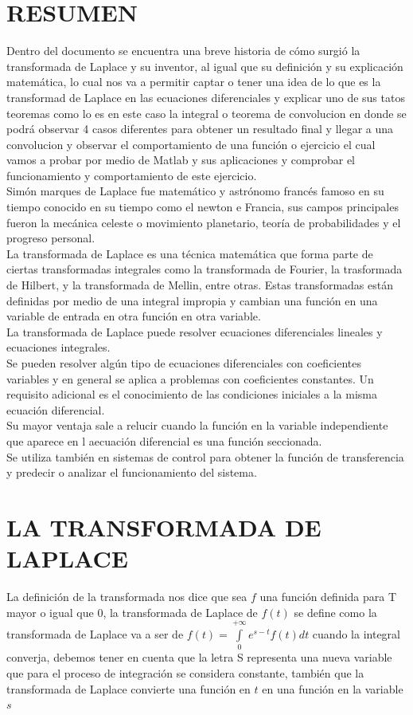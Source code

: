\documentclass[11pt,letterpaper]{article}
\begin{document}
\section{RESUMEN}
Dentro del documento se encuentra una breve historia de cómo surgió la transformada de Laplace y su inventor, al igual que su definición y su explicación matemática, lo cual nos va a permitir captar o tener una idea de lo que es la transformad de Laplace en las ecuaciones diferenciales y explicar uno de sus tatos teoremas como lo es en este caso la integral o teorema de convolucion en donde se podrá observar 4 casos diferentes para obtener un resultado final y llegar a una convolucion y observar el comportamiento de una función o ejercicio el cual vamos a probar por medio de Matlab y sus aplicaciones y comprobar el funcionamiento y comportamiento de este
ejercicio.\\
Simón marques de Laplace fue matemático y astrónomo francés famoso en su tiempo conocido en
su tiempo como el newton e Francia, sus campos principales fueron la mecánica celeste o
movimiento planetario, teoría de probabilidades y el progreso personal.\\
 La transformada de Laplace es una técnica matemática que forma parte de ciertas transformadas integrales como la transformada de Fourier, la trasformada de Hilbert, y la transformada de Mellin, entre otras. Estas transformadas están definidas por medio de una integral impropia y
cambian una función en una variable de entrada en otra función en otra variable. 
\\La transformada de Laplace puede resolver ecuaciones diferenciales lineales y ecuaciones
integrales.\\Se pueden resolver algún tipo de ecuaciones diferenciales con coeficientes variables y en general se aplica a problemas con coeficientes constantes. Un requisito adicional es el conocimiento de las
condiciones iniciales a la misma ecuación diferencial.\\Su mayor ventaja sale a relucir cuando la función en la variable independiente que aparece en l aecuación diferencial es una función seccionada.\\
Se utiliza también en sistemas de control para obtener la función de transferencia y predecir o analizar el funcionamiento del sistema.\\
\section{LA TRANSFORMADA DE LAPLACE}
La definición de la transformada nos dice que sea $f$ una función definida para T mayor o igual que
$0$, la transformada de Laplace de $f(t)$ se define como la transformada de Laplace va a ser de $f(t)= \overset{+ \infty }{\underset{0}{\int }} e^{s-t} f(t)dt $ cuando la integral converja, debemos tener en cuenta que la letra S representa
una nueva variable que para el proceso de integración se considera constante, también que la transformada de Laplace convierte una función en $t$ en una función en la variable $s$
\end{document}
